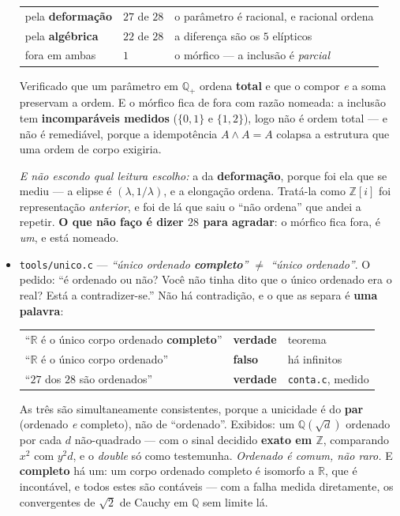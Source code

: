 \documentclass[11pt]{article}
\newcommand{\code}[1]{\texttt{\small #1}}
\newcommand{\Z}{\mathbb Z}
\newcommand{\R}{\mathbb R}
\newcommand{\Q}{\mathbb Q}
\theoremstyle{plain}
\theoremstyle{remark}
\begin{document}
\begin{itemize}
\begin{center}\begin{tabular}{lll}
pela \textbf{deformação} & $27$ de $28$ & o parâmetro é racional, e racional ordena \\
pela \textbf{algébrica} & $22$ de $28$ & a diferença são os $5$ elípticos \\
fora em ambas & $1$ & o mórfico --- a inclusão é \emph{parcial} \\
\end{tabular}\end{center}

Verificado que um parâmetro em $\Q_+$ ordena \textbf{total} e que o compor \emph{e} a soma
preservam a ordem. E o mórfico fica de fora com razão nomeada: a inclusão tem \textbf{incomparáveis
medidos} ($\{0,1\}$ e $\{1,2\}$), logo não é ordem total --- e não é remediável, porque a
idempotência $A\wedge A = A$ colapsa a estrutura que uma ordem de corpo exigiria.

\emph{E não escondo qual leitura escolho:} a da \textbf{deformação}, porque foi ela que se mediu
--- a elipse é $(\lambda,1/\lambda)$, e a elongação ordena. Tratá-la como $\Z[i]$ foi representação
\emph{anterior}, e foi de lá que saiu o ``não ordena'' que andei a repetir. \textbf{O que não faço é
dizer $28$ para agradar}: o mórfico fica fora, é \emph{um}, e está nomeado.
\item \code{tools/unico.c} --- \emph{``único ordenado \textbf{completo}'' $\neq$ ``único
ordenado''}. O pedido: ``é ordenado ou não? Você não tinha dito que o único ordenado era o real?
Está a contradizer-se.'' Não há contradição, e o que as separa é \textbf{uma palavra}:

\begin{center}\begin{tabular}{lll}
``$\R$ é o único corpo ordenado \textbf{completo}'' & \textbf{verdade} & teorema \\
``$\R$ é o único corpo ordenado'' & \textbf{falso} & há infinitos \\
``$27$ dos $28$ são ordenados'' & \textbf{verdade} & \code{conta.c}, medido \\
\end{tabular}\end{center}

As três são simultaneamente consistentes, porque a unicidade é do \textbf{par} (ordenado \emph{e}
completo), não de ``ordenado''. Exibidos: um $\Q(\sqrt d)$ ordenado por cada $d$ não-quadrado ---
com o sinal decidido \textbf{exato em $\Z$}, comparando $x^2$ com $y^2d$, e o \emph{double} só como
testemunha. \emph{Ordenado é comum, não raro.} E \textbf{completo} há um: um corpo ordenado
completo é isomorfo a $\R$, que é incontável, e todos estes são contáveis --- com a falha medida
diretamente, os convergentes de $\sqrt2$ de Cauchy em $\Q$ sem limite lá.


\end{itemize}
\end{document}
